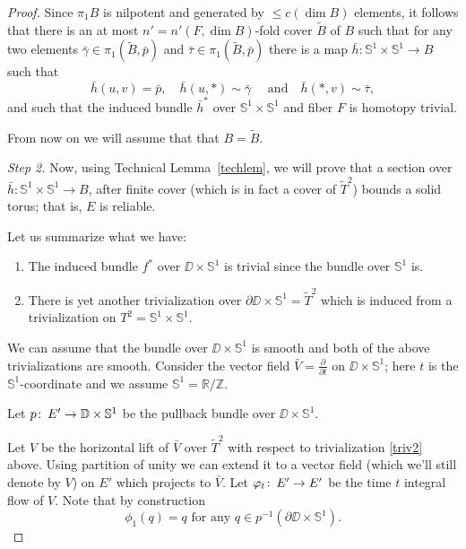 \documentclass{amsart}
\begin{document}
\begin{proof}
Since $\pi_1 B$ is nilpotent and generated by $\le c(\dim B)$ elements,
it follows that there is  an at most $n'=n'(F,\dim B)$-fold  cover $\widetilde B$ of $B$ such that for any two elements $\bar\gamma\in \pi_1(\tilde B,\bar p)$ and $\bar\tau\in \pi_1(\tilde B,\bar p)$ there is a map 
$\bar h\colon \mathbb{S}^1\times \mathbb{S}^1\to B$ such that 
$$\bar h(u,v)=\bar p,\quad
\bar h(u,*)\sim\bar\gamma\quad\text{ and}\quad
\bar h(*,v)\sim\bar\tau,$$
and such that the induced bundle $\bar h^*$ over $\mathbb{S}^1\times \mathbb{S}^1$ and fiber $F$ is homotopy trivial.

\medskip

From now on we will assume that that $B=\tilde B$.

\medskip

\noindent\textit{Step 2.} 
Now, using Technical Lemma~\ref{techlem}, 
we will prove that a section over 
$\bar h\colon \mathbb{S}^1\times \mathbb{S}^1\to B$, after finite cover (which is in fact a cover of $\tilde T^2$) bounds a solid torus;
that is, $ E$ is reliable. 

Let us summarize what we have:

\begin{enumerate}
\item \label{triv1} The  induced bundle $f^*$ over $\DD\times \mathbb{S}^1$ is trivial since the bundle over $\mathbb{S}^1$ is. 
\item \label{triv2} There is yet another  trivialization over $\partial \DD\times \mathbb{S}^1=\widetilde T^2$ which is induced from a  trivialization on $T^2=\mathbb{S}^1\times \mathbb{S}^1$.
\end{enumerate}


We can assume  that the bundle over $\DD\times \mathbb{S}^1$ is smooth and both of the above trivializations are smooth. 
Consider the vector field $\bar V=\frac {\partial }{\partial t}$ on $\DD\times \mathbb{S}^1$;
here $t$ is the $\mathbb{S}^1$-coordinate and we assume $\mathbb{S}^1=\mathbb{R}/\mathbb{Z}$.

Let $p\colon\thinspace E'\to \mathbb{D}\times \mathbb{S}^1$ be the pullback bundle over  $\DD\times \mathbb{S}^1$. 

Let $ V$ be the horizontal lift of $\bar V$ over $\tilde T^2$ with respect to  trivialization \eqref{triv2} above. 
Using partition of unity we can extend it to a vector field (which we'll still denote by $V$) on $E'$  which projects to $\bar V$. 
Let $\varphi_t\colon\thinspace E'\to E'$ be the time $t$ integral flow of $V$. 
Note that by construction 
\begin{equation}\label{monodr-bry}
\phi_1(q)=q \text{ for any } q \in p^{-1}(\partial \DD\times\mathbb{S}^1).
\end{equation}


\end{proof}
\end{document}
